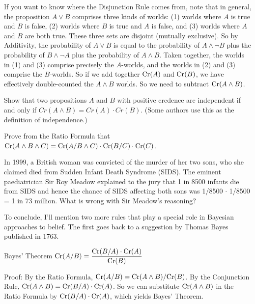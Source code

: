 If you want to know where the Disjunction Rule comes from, note that
in general, the proposition $A\lor B$ comprises three kinds of worlds:
(1) worlds where $A$ is true and $B$ is false, (2) worlds where $B$ is
true and $A$ is false, and (3) worlds where $A$ and $B$ are both true.
These three sets are disjoint (mutually exclusive). So by Additivity,
the probability of $A \lor B$ is equal to the probability of
$A \land \neg B$ plus the probability of $B \land \neg A$ plus the
probability of $A \land B$. Taken together, the worlds in (1) and (3)
comprise precisely the $A$-worlds, and the worlds in (2) and (3)
comprise the $B$-worlds. So if we add together $\text{Cr}(A)$ and $\text{Cr}(B)$,
we have effectively double-counted the $A \land B$ worlds. So we need
to subtract $\text{Cr}(A \land B)$.

\begin{exercise}{1}
  Show that two propositions $A$ and $B$ with positive credence are independent
  if and only if $Cr(A \land B) = Cr(A) \cdot Cr(B)$. (Some authors use this as
  the definition of independence.)
\end{exercise}

\begin{exercise}{2}\label{e:chain-rule}
  Prove from the Ratio Formula that $\text{Cr}(A \land B \land C) = \text{Cr}(A/B
  \land C) \cdot \text{Cr}(B/C) \cdot \text{Cr}(C)$.
  \vspace{-2mm}
\end{exercise}

\begin{exercise}{1}
  In 1999, a British woman was convicted of the murder of her two
  sons, who she claimed died from Sudden Infant Death Syndrome
  (SIDS). The eminent paediatrician Sir Roy Meadow explained to the
  jury that 1 in 8500 infants die from SIDS and hence the chance of
  SIDS affecting both sons was 1/8500 $\cdot$ 1/8500 = 1 in 73
  million. What is wrong with Sir Meadow's reasoning? 
\end{exercise}

To conclude, I'll mention two more rules that play a special role in
Bayesian approaches to belief. The first goes back to a suggestion by Thomas
Bayes published in 1763.
%
\begin{genericthm}{Bayes' Theorem}
  \leavevmode\vspace{-3mm}
  \quad\newline
  $\text{Cr}(A/B) = \dfrac{\text{Cr}(B/A) \cdot \text{Cr}(A)}{\text{Cr}(B)}$
\end{genericthm}
%
Proof: By the Ratio Formula, $\text{Cr}(A/B) = \text{Cr}(A \land B) / \text{Cr}(B)$. By
the Conjunction Rule, $\text{Cr}(A \land B) = \text{Cr}(B/A) \cdot \text{Cr}(A)$. So we
can substitute $\text{Cr}(A \land B)$ in the Ratio Formula by
$\text{Cr}(B/A)\cdot \text{Cr}(A)$, which yields Bayes' Theorem.

